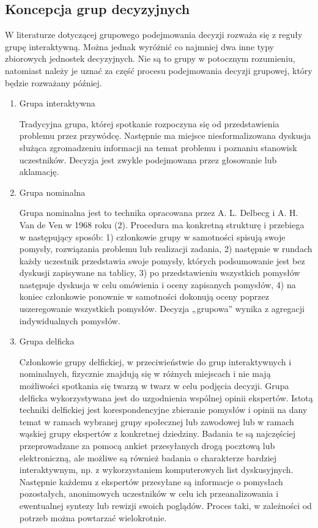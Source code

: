 \subsection{Koncepcja grup decyzyjnych}
W literaturze dotyczącej grupowego podejmowania decyzji rozważa się z reguły
grupę interaktywną. Można jednak wyróżnić co najmniej dwa inne typy zbiorowych
jednostek decyzyjnych. Nie są to grupy w potocznym rozumieniu, natomiast należy
je uznać za część procesu podejmowania decyzji grupowej, który będzie rozważany
później.
\begin{enumerate}[1)]
  \item Grupa interaktywna
  
  Tradycyjna grupa, której spotkanie rozpoczyna się od przedstawienia problemu
  przez przywódcę. Następnie ma miejsce niesformalizowana dyskusja służąca
  zgromadzeniu informacji na temat problemu i poznaniu stanowisk uczestników.
  Decyzja jest zwykle podejmowana przez głosowanie lub aklamację.

  \item Grupa nominalna
  
  Grupa nominalna jest to technika opracowana przez A. L. Delbecg i A. H. Van de
  Ven w 1968 roku (2). Procedura ma konkretną strukturę i przebiega w
  następujący sposób: 1) członkowie grupy w samotności spisują swoje pomysły,
  rozwiązania problemu lub realizacji zadania, 2) następnie w rundach każdy
  uczestnik przedstawia swoje pomysły, których podsumowanie jest bez dyskusji
  zapisywane na tablicy, 3) po przedstawieniu wszystkich pomysłów następuje
  dyskusja w celu omówienia i oceny zapisanych pomysłów, 4) na koniec członkowie
  ponownie w samotności dokonują oceny poprzez uszeregowanie wszystkich
  pomysłów. Decyzja „grupowa” wynika z agregacji indywidualnych pomysłów.

  \item Grupa delficka
  
  Członkowie grupy delfickiej, w przeciwieństwie do grup
  interaktywnych i nominalnych, fizycznie znajdują się w różnych miejscach i
  nie mają możliwości spotkania się twarzą w twarz w celu podjęcia decyzji.
  Grupa delficka wykorzystywana jest do uzgodnienia wspólnej opinii ekspertów. 
  Istotą techniki delfickiej jest korespondencyjne zbieranie pomysłów i opinii 
  na dany temat w ramach wybranej grupy społecznej lub zawodowej lub w ramach 
  wąskiej grupy ekspertów z konkretnej dziedziny. Badania te są najczęściej 
  przeprowadzane za pomocą ankiet przesyłanych drogą pocztową lub elektroniczną,
  ale możliwe są również badania o charakterze bardziej interaktywnym, np.
  z wykorzystaniem  komputerowych list dyskusyjnych. Następnie każdemu z
  ekspertów przesyłane są informacje o pomysłach pozostałych, anonimowych 
  uczestników w celu ich przeanalizowania i ewentualnej syntezy lub rewizji 
  swoich poglądów. Proces taki, w zależności od potrzeb można powtarzać 
  wielokrotnie.

\end{enumerate}


